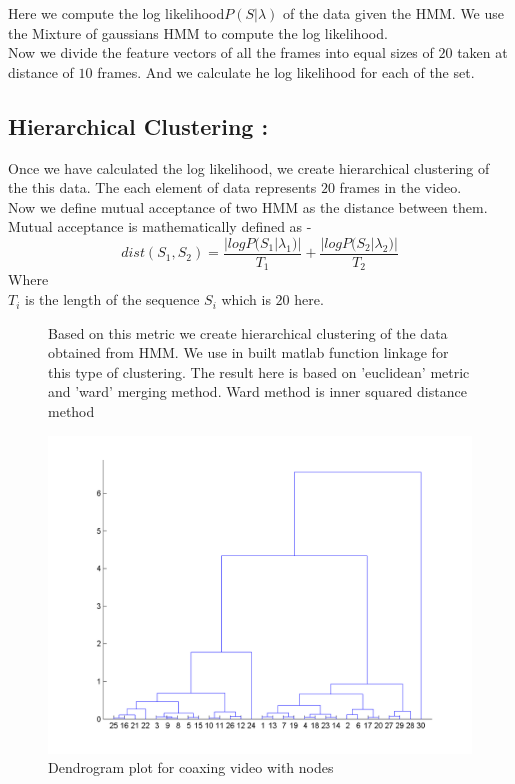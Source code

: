 \documentclass[11pt]{report}
\begin{document}
Here we compute the log likelihood$P(S|\lambda)$ of the data given the HMM. We use the Mixture of gaussians HMM to compute the log likelihood.\\
Now we divide the feature vectors of all the frames into equal sizes of $20$ taken at distance of $10$ frames. And we calculate he log likelihood for each of the set.\\
\subsection*{Hierarchical Clustering :}
Once we have calculated the log likelihood, we create hierarchical clustering of the this data. The each element of data represents $20$ frames in the video.\\
Now we define mutual acceptance of two HMM as the distance between them. Mutual acceptance is mathematically defined as - \\
$$dist(S_1, S_2) = \frac{|logP(S_1|\lambda _ 1)|}{T_1} +\frac{|logP(S_2|\lambda _ 2)|}{T_2} $$
Where\\
\hspace*{30pt} $T_i$ is the length of the sequence $S_i$ which is $20$ here.\\

\begin{figure}[h!]
\begin{minipage}[c]{0.5 \textwidth}
\centering
Based on this metric we create hierarchical clustering of the data obtained from HMM. We use in built matlab function linkage for this type of clustering. The result here is based on 'euclidean' metric and 'ward' merging method. Ward method is inner squared distance method\\
\end{minipage}
\begin{minipage}[c]{0.4 \textwidth}
\centering
\includegraphics[scale=0.3]{dendoCoax.png}
\caption{Dendrogram plot for coaxing video with  nodes}
\end{minipage}
\end{figure}
\end{document}
